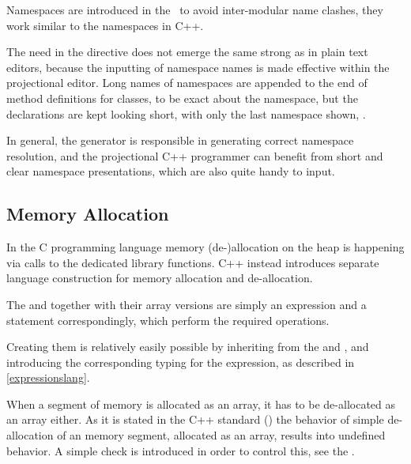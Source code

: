 Namespaces are introduced in the \pcpp\ to avoid inter-modular name clashes, they work similar to 
the namespaces in C++.

The need in the  directive does not emerge the same strong as in plain text editors, because the inputting of namespace names is
made effective within the projectional editor. Long names of namespaces are appended to the end of method
definitions for classes, to be exact about the namespace, but the declarations are kept looking short, with only 
the last namespace shown, .


In general, the generator is responsible in generating correct namespace 
resolution, and the projectional C++ programmer can benefit from short and clear namespace
presentations, which are also quite handy to input.


\subsection{Memory Allocation}

In the C programming language memory (de-)allocation on the heap is happening via calls to the dedicated library functions. 
C++ instead introduces separate language construction for memory allocation and de-allocation. 

The  and  together with their array versions are simply an expression and a statement correspondingly,
which perform the required operations.

Creating them is relatively easily possible by inheriting from the  and  ,
and introducing the corresponding typing for the  expression, as described in \ref{expressionslang}.

When a segment of memory is allocated as an array, it has to be de-allocated as an array either.
As it is stated in the C++ standard (\cite{cpp11}) the behavior of simple de-allocation of an 
memory segment, allocated as an array, results into undefined behavior. A simple check is introduced
in order to control this, see the . 







%
%



